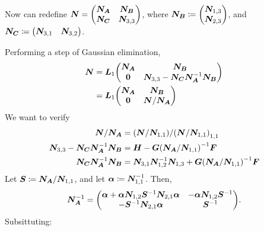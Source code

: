 \documentclass[twoside,10pt]{article}
\begin{document}
Now can redefine $\bm{N} = \begin{pmatrix}
 \bm{N_A} & \bm{N_B} \\
 \bm{N_C} & \bm{N}_{3,3}
\end{pmatrix}$, where $\bm{N_B} \coloneqq \begin{pmatrix}\bm{N}_{1,3}\\\bm{N}_{2,3}\end{pmatrix}$, and $\bm{N_C} \coloneqq \begin{pmatrix}\bm{N}_{3,1}&\bm{N}_{3,2}\end{pmatrix}$.

Performing a step of Gaussian elimination,
\begin{align*}
  \mtx{N} &= \mtx{L}_1\begin{pmatrix}
    \mtx{N_A} & \mtx{N_B} \\
    \mtx{0} & \mtx{N}_{3,3} - \mtx{N_C}\mtx{N_A}^{-1}\mtx{N_B}
  \end{pmatrix}\\
  &= \mtx{L}_1\begin{pmatrix}
    \mtx{N_A} & \mtx{N_B} \\
    \mtx{0} & \mtx{N} / \mtx{N_A}
  \end{pmatrix}\
\end{align*}
We want to verify
\begin{align*}
  \mtx{N} / \mtx{N_A} &= \left(\mtx{N} / \mtx{N}_{1, 1}\right) / \left(\mtx{N} / \mtx{N}_{1, 1}\right)_{1, 1}\\
  \mtx{N}_{3,3} - \mtx{N_C}\mtx{N_A}^{-1}\mtx{N_B} &= \mtx{H} - \mtx{G} \left(\mtx{N_{A}} / \mtx{N}_{1,1}\right)^{-1} \mtx{F}\\
  \mtx{N_C}\mtx{N_A}^{-1}\mtx{N_B} &= \mtx{N}_{3,1}\mtx{N}_{1,2}^{-1}\mtx{N}_{1,3} + \mtx{G} \left(\mtx{N_{A}} / \mtx{N}_{1,1}\right)^{-1} \mtx{F}\\
\end{align*}
Let $\bm{S} \coloneqq\bm{N_{A}} / \bm{N}_{1,1}$, and let $\bm{\alpha} \coloneqq \bm{N}_{1,1}^{-1}$.
Then,
\begin{equation*}
 \mtx{N_A}^{-1} = \begin{pmatrix}
  \mtx{\alpha} + \mtx{\alpha}\mtx{N}_{1,2}\mtx{S}^{-1}\mtx{N}_{2,1}\mtx{\alpha} & -\mtx{\alpha}\mtx{N}_{1,2}\mtx{S}^{-1}\\
  -\mtx{S}^{-1}\mtx{N}_{2,1}\mtx{\alpha} & \mtx{S}^{-1}
\end{pmatrix}.
\end{equation*}
Subsittuting:
\end{document}
